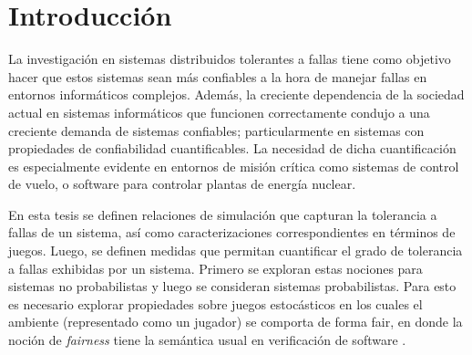 \chapter{Introducción}
\label{cap:introduccion}

La investigación en sistemas distribuidos tolerantes a fallas tiene como objetivo hacer que estos sistemas sean más confiables a la hora de manejar fallas en entornos informáticos complejos. Además, la creciente dependencia de la sociedad actual en sistemas informáticos que funcionen correctamente condujo a una creciente demanda de sistemas confiables; particularmente en sistemas con propiedades de confiabilidad cuantificables. La necesidad de dicha cuantificación es especialmente evidente en entornos de misión crítica como sistemas de control de vuelo, o software para controlar plantas de energía nuclear.


En esta tesis se definen relaciones de simulación que capturan la tolerancia a fallas de un sistema, así como caracterizaciones correspondientes en términos de juegos. Luego, se definen medidas que permitan cuantificar el grado de tolerancia a fallas exhibidas por un sistema. Primero se exploran estas nociones para sistemas no probabilistas y luego se consideran sistemas probabilistas. Para esto es necesario explorar propiedades sobre juegos estocásticos en los cuales el ambiente (representado como un jugador) se comporta de forma fair, en donde la noción de \textit{fairness} tiene la semántica usual en verificación de software \cite{BaierK08}.

